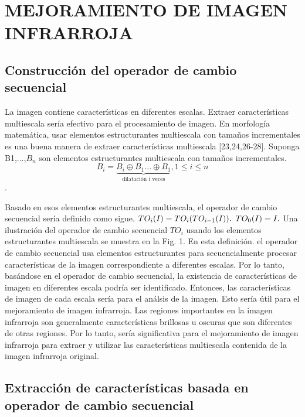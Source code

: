 \documentclass[a4paper, 11 pt, conference]{ieeeconf}      %
\begin{document}
\section{MEJORAMIENTO DE IMAGEN INFRARROJA}

\subsection{Construcci\'on del operador de cambio secuencial} 
La imagen contiene caracter\'isticas en diferentes escalas. Extraer caracter\'isticas multiescala ser\'ia efectivo para el procesamiento de imagen. En morfolog\'ia matem\'atica, usar elementos estructurantes multiescala con tamaños incrementales es una buena manera de extraer caracter\'isticas multiescala [23,24,26-28]. Suponga B1,...,$B_n$ son elementos estructurantes multiescala con tamaños incrementales. $$ B_i = \underbrace{B_i \oplus B_1 ... \oplus B_1 }_\text{dilataci\'on i veces}, 1 \leq i \leq n $$. 

Basado en esos elementos estructurantes multiescala, el operador de cambio secuencial ser\'ia definido como sigue.
$\\\\
TO_i(I) = TO_i(TO_{i-1}(I)).
$
$\\
TO_0(I) = I.\\\\
$
Una ilustraci\'on del operador de cambio secuencial $TO_i$ usando los elementos estructurantes multiescala se muestra en la Fig. 1. En esta definici\'on. el operador de cambio secuencial usa elementos estructurantes para secuencialmente procesar caracter\'isticas de la imagen correspondiente a diferentes escalas. Por lo tanto, bas\'andose en el operador de cambio secuencial, la existencia de caracter\'isticas de imagen en diferentes escala podr\'ia ser identificado. Entonces, las caracter\'isticas de imagen de cada escala ser\'ia para el an\'alsis de la imagen. Esto ser\'ia \'util para el mejoramiento de imagen infrarroja.
Las regiones importantes en la imagen infrarroja son generalmente caracter\'isticas brillosas u oscuras que son diferentes de otras regiones. Por lo tanto, ser\'ia significativa para el mejoramiento de imagen infrarroja para extraer y utilizar las caracter\'isticas multiescala contenida de la imagen infrarroja original.

\subsection{Extracci\'on de caracter\'isticas basada en operador de cambio secuencial}
\end{document}
